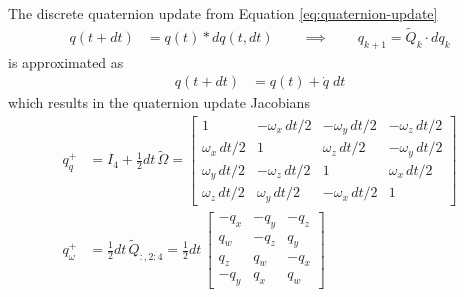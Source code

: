 The discrete quaternion update from Equation \ref{eq:quaternion-update}
\begin{align}
    q(t + dt) &= q(t) * dq(t,dt) 
    \qquad \implies
    \qquad q_{k+1} = \tilde Q_k \cdot dq_k
\end{align}
is approximated as 
\begin{align}
    q(t + dt) &= q(t) + \dot q \; dt
\end{align}
which results in the quaternion update Jacobians
\begin{align}
    q_q^+ &= I_4 + \frac{1}{2} dt \,\tilde \Omega =\begin{bmatrix}
        1 & -\omega_x \,dt/2 & -\omega_y \,dt/2 & -\omega_z \,dt/2 \\
        \omega_x \,dt/2 & 1 & \omega_z \,dt/2 & -\omega_y \,dt/2 \\
        \omega_y \,dt/2 & -\omega_z \,dt/2 & 1 & \omega_x \,dt/2 \\
        \omega_z \,dt/2 & \omega_y \,dt/2 & -\omega_x\,dt/2 & 1 
    \end{bmatrix}    
    \\
    q_\omega^+ &= \frac{1}{2} dt \, \tilde Q_{:, 2:4} = \frac{1}{2} dt \, \begin{bmatrix}
        -q_x & -q_y & -q_z \\
        q_w & -q_z & q_y \\
        q_z & q_w & -q_x \\
        -q_y & q_x & q_w
    \end{bmatrix} 
\end{align}

